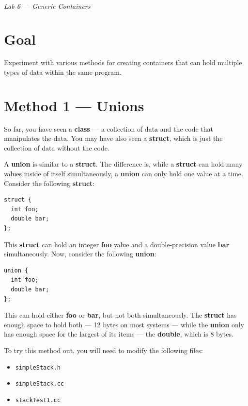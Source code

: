 \documentclass{article}
\begin{document}
\thispagestyle{empty}

\\[3pt]
\emph{\large Lab 6 --- Generic Containers}\\[3pt]

\section{Goal}
Experiment with various methods for creating containers that can hold multiple
types of data within the same program.

\section{Method 1 --- Unions}
So far, you have seen a {\bf class} --- a collection of data and the code that
manipulates the data. You may have also seen a {\bf struct}, which is just the
collection of data without the code.\parend

A {\bf union} is similar to a {\bf struct}. The difference is, while a
{\bf struct} can hold many values inside of itself simultaneously, a {\bf union}
can only hold one value at a time. Consider the following {\bf struct}:
\begin{lstlisting}
struct {
  int foo;
  double bar;
};
\end{lstlisting}
\vskip6pt
This {\bf struct} can hold an integer {\bf foo} value and a double-precision
value {\bf bar} simultaneously.\parend
Now, consider the following {\bf union}:
\begin{lstlisting}
union {
  int foo;
  double bar;
};
\end{lstlisting}
\vskip6pt
This can hold either {\bf foo} or {\bf bar}, but not both simultaneously. The
{\bf struct} has enough space to hold both --- 12 bytes on most systems ---
while the {\bf union} only has enough space for the largest of its items ---
the {\bf double}, which is 8 bytes.\parend

To try this method out, you will need to modify the following files:
\begin{itemize}
  \item {\tt simpleStack.h}
  \item {\tt simpleStack.cc}
  \item {\tt stackTest1.cc}
\end{itemize}
\end{document}

